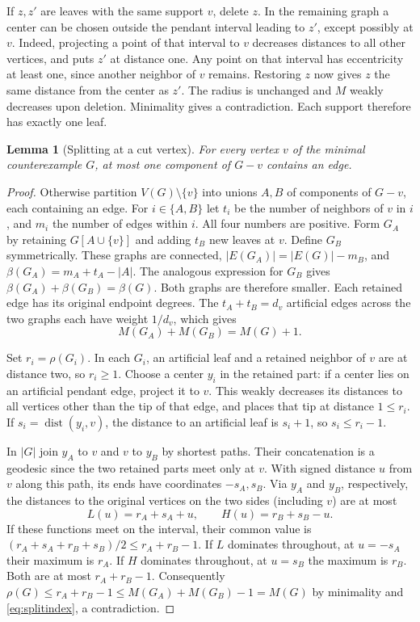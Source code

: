 \documentclass[11pt,a4paper]{article}
\newtheorem{lemma}[theorem]{Lemma}
\newcommand{\dist}{\operatorname{dist}}
\begin{document}
If $z,z'$ are leaves with the same support $v$, delete $z$. In the
remaining graph a center can be chosen outside the pendant interval
leading to $z'$, except possibly at $v$. Indeed, projecting a point
of that interval to $v$ decreases distances to all other vertices,
and puts $z'$ at distance one. Any point on that interval has
eccentricity at least one, since another neighbor of $v$ remains.
Restoring $z$ now gives $z$ the same distance from the center as $z'$.
The radius is unchanged and $M$ weakly decreases upon deletion.
Minimality gives a contradiction. Each support therefore has exactly
one leaf.

\begin{lemma}[Splitting at a cut vertex]\label{lem:split}
For every vertex $v$ of the minimal counterexample $G$, at most one
component of $G-v$ contains an edge.
\end{lemma}
\begin{proof}
Otherwise partition $V(G)\setminus\{v\}$ into unions $A,B$ of components
of $G-v$, each containing an edge. For $i\in\{A,B\}$ let $t_i$ be
the number of neighbors of $v$ in $i$, and $m_i$ the number of edges
within $i$. All four numbers are positive. Form $G_A$ by retaining
$G[A\cup\{v\}]$ and adding $t_B$ new leaves at $v$. Define $G_B$
symmetrically. These graphs are connected, $|E(G_A)|=|E(G)|-m_B$,
and $\beta(G_A)=m_A+t_A-|A|$. The analogous expression for $G_B$
gives $\beta(G_A)+\beta(G_B)=\beta(G)$. Both graphs are therefore
smaller. Each retained edge has its original endpoint degrees.
The $t_A+t_B=d_v$ artificial edges across the two graphs each have
weight $1/d_v$, which gives
\begin{equation}\label{eq:splitindex}
 M(G_A)+M(G_B)=M(G)+1 .
\end{equation}

Set $r_i=\rho(G_i)$. In each $G_i$, an artificial leaf and a retained
neighbor of $v$ are at distance two, so $r_i\ge1$. Choose a center
$y_i$ in the retained part: if a center lies on an artificial pendant
edge, project it to $v$. This weakly decreases its distances to all
vertices other than the tip of that edge, and places that tip at
distance $1\le r_i$. If $s_i=\dist(y_i,v)$, the distance to an
artificial leaf is $s_i+1$, so $s_i\le r_i-1$.

In $|G|$ join $y_A$ to $v$ and $v$ to $y_B$ by shortest paths. Their
concatenation is a geodesic since the two retained parts meet only at
$v$. With signed distance $u$ from $v$ along this path, its ends have
coordinates $-s_A,s_B$. Via $y_A$ and $y_B$, respectively, the
distances to the original vertices on the two sides (including $v$)
are at most
\[
 L(u)=r_A+s_A+u,\qquad H(u)=r_B+s_B-u .
\]
If these functions meet on the interval, their common value is
$(r_A+s_A+r_B+s_B)/2\le r_A+r_B-1$. If $L$ dominates throughout,
at $u=-s_A$ their maximum is $r_A$. If $H$ dominates throughout,
at $u=s_B$ the maximum is $r_B$. Both are at most $r_A+r_B-1$.
Consequently $\rho(G)\le r_A+r_B-1\le M(G_A)+M(G_B)-1=M(G)$ by
minimality and \eqref{eq:splitindex}, a contradiction.
\end{proof}
\end{document}
